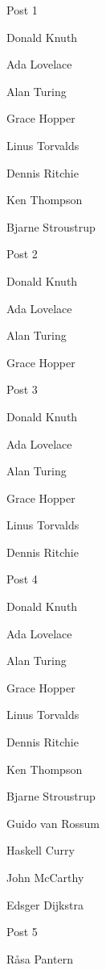 \documentclass{dsekelectionproposal}
\begin{document}
\maketitle

\begin{vemsection}
    \begin{vemlist}{Post 1}
        \item Donald Knuth
        \item Ada Lovelace
        \item Alan Turing
        \item Grace Hopper
        \item Linus Torvalds
        \item Dennis Ritchie
        \item Ken Thompson
        \item Bjarne Stroustrup
    \end{vemlist}

    \begin{vemlist}{Post 2}
        \item Donald Knuth
        \item Ada Lovelace
        \item Alan Turing
        \item Grace Hopper
    \end{vemlist}

    \begin{vemlist}{Post 3}
        \item Donald Knuth
        \item Ada Lovelace
        \item Alan Turing
        \item Grace Hopper
        \item Linus Torvalds
        \item Dennis Ritchie
    \end{vemlist}

    \begin{vemlist}{Post 4}
        \item Donald Knuth
        \item Ada Lovelace
        \item Alan Turing
        \item Grace Hopper
        \item Linus Torvalds
        \item Dennis Ritchie
        \item Ken Thompson
        \item Bjarne Stroustrup
        \item Guido van Rossum
        \item Haskell Curry
        \item John McCarthy
        \item Edsger Dijkstra
    \end{vemlist}

    \begin{vemlist}{Post 5}
        \item Råsa Pantern
    \end{vemlist}

\end{vemsection}
\end{document}
